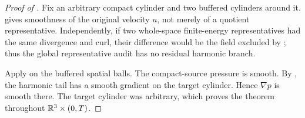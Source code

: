 \begin{proof}[Proof of ]
Fix an arbitrary compact cylinder and two buffered cylinders around it.
 gives smoothness of the original velocity
\(u\), not merely of a quotient representative.  Independently, if two
whole-space finite-energy representatives had the same divergence and curl,
their difference would be the field excluded by
; thus the global representative audit has
no residual harmonic branch.

Apply  on the buffered spatial balls.  The
compact-source pressure is smooth.  By
, the harmonic tail has a smooth gradient on
the target cylinder.  Hence \(\nabla p\) is smooth there.  The target cylinder
was arbitrary, which proves the theorem throughout
\(\mathbb R^3\times(0,T)\).
\end{proof}
